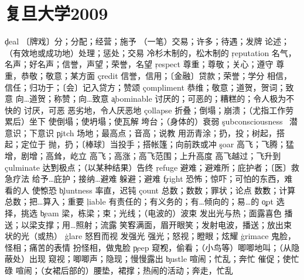 \section{复旦大学2009}
\begin{multicols}{2}
\c{deal}  \vt 〔牌戏〕分；分配；经营；施予 \n （一笔）交易；许多；待遇；发牌 \vi 论述；（有效地或成功地）处理；惩处；交易 \a 冷杉木制的，松木制的 
\c{reputation}  \n 名气，名声；好名声；信誉，声望；荣誉，名望
\c{respect}  \vt 尊重；尊敬；关心；遵守 \n 尊重，恭敬；敬意；某方面
\c{credit}  \n 信誉，信用；〔金融〕贷款；荣誉；学分 \vt 相信，信任；归功于；〔会〕记入贷方；赞颂 
\c{compliment}  \n 恭维；敬意；道贺，贺词；致意 \vt 向…道贺；称赞；向…致意
\c{abominable}  \a 讨厌的；可恶的；糟糕的；令人极为不快的 \n 讨厌，可恶 \ad 恶劣地，令人厌恶地
\c{collapse}  \vi 折叠；倒塌；崩溃；（尤指工作劳累后）坐下 \vt 使倒塌；使坍塌；使瓦解 \n 垮台；（身体的）衰弱
\c{subconsciousness}  \ 潜意识；下意识
\c{pitch}  \n 场地；最高点；音高；说教 \vt 用沥青涂；扔，投；树起，搭起；定位于 \vi 抛，扔；〔棒球〕当投手；搭帐篷；向前跌或冲
\c{soar}  \vi 高飞；飞腾；猛增，剧增；高耸，屹立 \n 高飞；高涨；高飞范围；上升高度 \vt 高飞越过；飞升到
\c{culminate}  \v 达到极点；（以某种结果）告终 
\c{refuge}  \n 避难；避难所；庇护者；〔医〕救急疗法 \vt 给予…庇护；接纳…避难 \vi 躲避；避难
\c{fright}  \n 恐怖；惊吓；可怕的东西，难看的人 \v 使惊恐
\c{bluntness}  \n 率直，迟钝
\c{count}  \n 总数；数数；罪状；论点 \v 数数；计算总数；把…算入；重要 
\c{liable}  \a 有责任的；有义务的；有…倾向的；易…的
\c{opt} \yb{6pt} \vi 选择，挑选
\c{beam}  \n 梁，栋梁；束；光线；（电波的）波束 \vi 发出光与热；面露喜色 \vt 播送；以梁支撑；用…照射；流露 \v 笑容满面，眉开眼笑；发射电波，播送；放出束状的光（或热）
\c{glare}  \v 怒目而视 \vi 发强光 \n 强光；怒视；瞪眼；炫耀
\c{grimace}  \n 鬼脸，怪相；痛苦的表情 \vi 扮怪相，做鬼脸
\c{peep}  \v 窥视，偷看；（小鸟等）唧唧地叫；（从隐蔽处）出现 \n 窥视；唧唧声；隐现；慢慢露出
\c{bustle}  \vi 喧闹；忙乱；奔忙 \vt 催促；使忙碌 \n 喧闹；（女裙后部的）腰垫，裙撑；热闹的活动；奔走，忙乱

\end{multicols}
